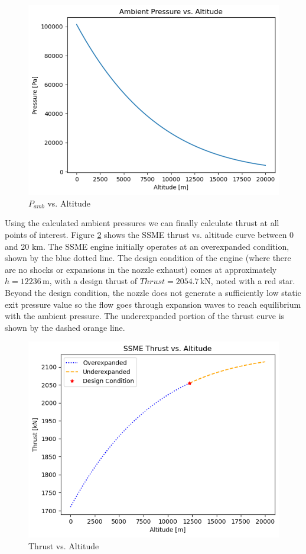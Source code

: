 \documentclass[../main.tex]{subfiles}
\begin{document}
\begin{figure}[h!]
    \centering
    \includegraphics[scale=0.8]{../../images/problem_3/pamb_vs_alt.png}
    \caption{\(P_{amb}\) vs. Altitude}
    \label{p_vs_alt}
\end{figure}

Using the calculated ambient pressures we can finally calculate thrust at all points of interest.
Figure \ref{t_vs_alt} shows the SSME thrust vs. altitude curve between 0 and 20 \(\unit{\kilo\meter}\).
The SSME engine initially operates at an overexpanded condition, shown by the blue dotted line.
The design condition of the engine (where there are no shocks or expansions in the nozzle exhaust) comes at approximately \(h = 12236 \,\unit{\meter}\), with a design thrust of \(Thrust = 2054.7\,\unit{\kilo\newton}\), noted with a red star.
Beyond the design condition, the nozzle does not generate a sufficiently low static exit pressure value so the flow goes through expansion waves to reach equilibrium with the ambient pressure.
The underexpanded portion of the thrust curve is shown by the dashed orange line.

\begin{figure}[h!]
    \centering
    \includegraphics[scale=0.8]{../../images/problem_3/t_vs_alt.png}
    \caption{Thrust vs. Altitude}
    \label{t_vs_alt}
\end{figure}
\end{document}
